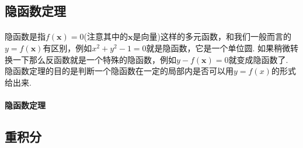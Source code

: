 \subsection{隐函数定理}
\paragraph{}
隐函数是指$f(\textbf{x}) = 0$(注意其中的$\textbf{x}$是向量)这样的多元函数，和我们一般而言的$y = f(\textbf{x})$有区别，例如$x^2 + y^2 - 1 = 0$就是隐函数，它是一个单位圆.  如果稍微转换一下那么反函数就是一个特殊的隐函数，例如$y - f(\textbf{x}) = 0$就变成隐函数了. 隐函数定理的目的是判断一个隐函数在一定的局部内是否可以用$y = f(x)$的形式给出来.  

\paragraph{}
\textbf{隐函数定理}\, 



\subsection{重积分}


